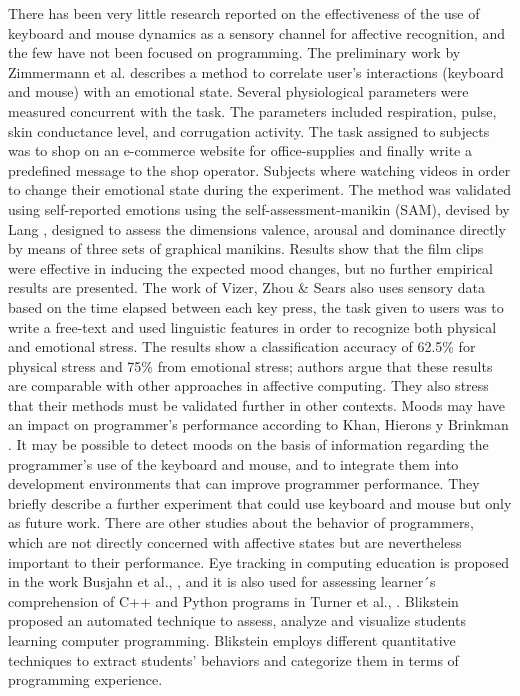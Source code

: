 \documentclass[a4paper]{llncs}
\begin{document}
There has been very little research reported on the effectiveness of the use of
keyboard and mouse dynamics as a sensory channel for affective recognition, and
the few have not been focused on programming. The preliminary work by Zimmermann
et al. \cite{zimmermann2003affective} describes a method to correlate user’s interactions (keyboard and
mouse) with an emotional state. Several physiological parameters were measured
concurrent with the task. The parameters included respiration, pulse, skin
conductance level, and corrugation activity. The task assigned to subjects was to
shop on an e-commerce website for office-supplies and finally write a predefined
message to the shop operator. Subjects where watching videos in order to change
their emotional state during the experiment. The method was validated using
self-reported emotions using the self-assessment-manikin (SAM), devised by Lang
\cite{lang1980behavioral}, designed to assess the dimensions valence, arousal and dominance
directly by means of three sets of graphical manikins. Results show that the
film clips were effective in inducing the expected mood changes, but no further
empirical results are presented. The work of Vizer, Zhou \& Sears \cite{vizer2009automated} also
uses sensory data based on the time elapsed between each key press, the task
given to users was to write a free-text and used linguistic features in order to
recognize both physical and emotional stress. The results show a classification
accuracy of 62.5\% for physical stress and 75\% from emotional stress; authors
argue that these results are comparable with other approaches in affective
computing. They also stress that their methods must be validated further in
other contexts. Moods may have an impact on programmer’s performance according
to Khan, Hierons y Brinkman \cite{khan2007mood}. It may be possible to detect moods
on the basis of information regarding the programmer’s use of the keyboard and
mouse, and to integrate them into development environments that can improve
programmer performance. They briefly describe a further experiment that could
use keyboard and mouse but only as future work. There are other studies about
the behavior of programmers, which are not directly concerned with affective
states but are nevertheless important to their performance. Eye tracking in
computing education is proposed in the work Busjahn et al., \cite{busjahn2014eye}, and it is
also used for assessing learner´s comprehension of C++ and Python programs in
Turner et al., \cite{turner2014eye}. Blikstein \cite{blikstein2011using} proposed 
an automated technique to
assess, analyze and visualize students learning computer programming. Blikstein
employs different quantitative techniques to extract students’ behaviors and
categorize them in terms of programming experience.
\end{document}
